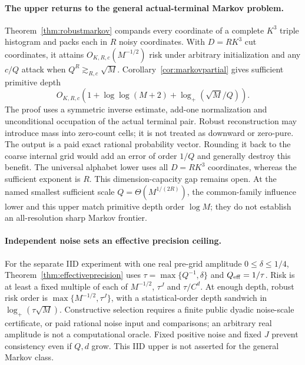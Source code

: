 \documentclass[11pt,letterpaper]{article}
\theoremstyle{definition}\newtheorem{definition}[theorem]{Definition}
\theoremstyle{remark}\newtheorem{remark}[theorem]{Remark}
\begin{document}
\paragraph{The upper returns to the general actual-terminal Markov problem.}
Theorem~\ref{thm:robustmarkov} compands every coordinate of a complete $K^3$ triple histogram and packs each in $R$ noisy coordinates. With $D=RK^3$ cut coordinates, it attains $O_{K,R,c}(M^{-1/2})$ risk under arbitrary initialization and any $c/Q$ attack when $Q^R\gtrsim_{R,c}\sqrt M$. Corollary~\ref{cor:markovpartial} gives sufficient primitive depth
\[
 O_{K,R,c}(1+\log\log(M+2)+\log_+(\sqrt M/Q)).
\]
The proof uses a symmetric inverse estimate, add-one normalization and unconditional occupation of the actual terminal pair. Robust reconstruction may introduce mass into zero-count cells; it is not treated as downward or zero-pure. The output is a paid exact rational probability vector. Rounding it back to the coarse internal grid would add an error of order $1/Q$ and generally destroy this benefit.
The universal alphabet lower uses all $D=RK^3$ coordinates, whereas the sufficient exponent is $R$. This dimension-capacity gap remains open. At the named smallest sufficient scale $Q=\Theta(M^{1/(2R)})$, the common-family influence lower and this upper match primitive depth order $\log M$; they do not establish an all-resolution sharp Markov frontier.

\paragraph{Independent noise sets an effective precision ceiling.}
For the separate IID experiment with one real pre-grid amplitude $0\le\delta\le1/4$, Theorem~\ref{thm:effectiveprecision} uses
$\tau=\max\{Q^{-1},\delta\}$ and $Q_{\rm eff}=1/\tau$.
Risk is at least a fixed multiple of each of $M^{-1/2}$, $\tau^J$ and $\tau/C^d$. At enough depth, robust risk order is $\max\{M^{-1/2},\tau^J\}$, with a statistical-order depth sandwich in $\log_+(\tau\sqrt M)$. Constructive selection requires a finite public dyadic noise-scale certificate, or paid rational noise input and comparisons; an arbitrary real amplitude is not a computational oracle. Fixed positive noise and fixed $J$ prevent consistency even if $Q,d$ grow. This IID upper is not asserted for the general Markov class.
\end{document}
